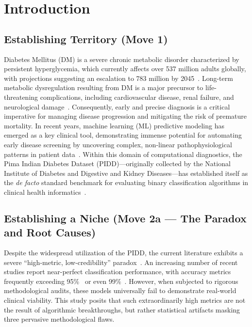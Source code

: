 \documentclass[3p,twocolumn]{elsarticle}
\begin{document}

\section{Introduction}

\subsection{Establishing Territory (Move 1)}

Diabetes Mellitus (DM) is a severe chronic metabolic disorder characterized by persistent hyperglycemia, which currently affects over 537 million adults globally, with projections suggesting an escalation to 783 million by 2045~\cite{IDF2021, Saeedi2019}. Long-term metabolic dysregulation resulting from DM is a major precursor to life-threatening complications, including cardiovascular disease, renal failure, and neurological damage~\cite{Saeedi2019, Zheng2018}. Consequently, early and precise diagnosis is a critical imperative for managing disease progression and mitigating the risk of premature mortality. In recent years, machine learning (ML) predictive modeling has emerged as a key clinical tool, demonstrating immense potential for automating early disease screening by uncovering complex, non-linear pathophysiological patterns in patient data~\cite{Tonin2025, Amri2025}. Within this domain of computational diagnostics, the Pima Indian Diabetes Dataset (PIDD)---originally collected by the National Institute of Diabetes and Digestive and Kidney Diseases---has established itself as the \textit{de facto} standard benchmark for evaluating binary classification algorithms in clinical health informatics~\cite{Smith1988, KagglePIDD}.

\subsection{Establishing a Niche (Move 2a --- The Paradox and Root Causes)}

Despite the widespread utilization of the PIDD, the current literature exhibits a severe ``high-metric, low-credibility'' paradox~\cite{Wen2024Leakage}. An increasing number of recent studies report near-perfect classification performance, with accuracy metrics frequently exceeding 95\%~\cite{Mehta2024} or even 99\%~\cite{Akbar2023}. However, when subjected to rigorous methodological audits, these models universally fail to demonstrate real-world clinical viability. This study posits that such extraordinarily high metrics are not the result of algorithmic breakthroughs, but rather statistical artifacts masking three pervasive methodological flaws.
\end{document}
